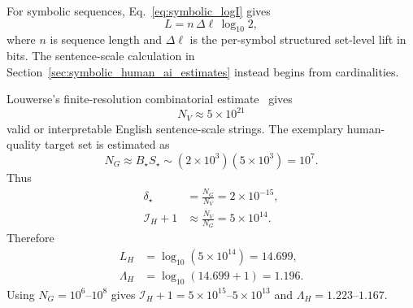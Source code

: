 \documentclass[
  aps,
  prresearch,
  reprint,
  amsmath,
  amssymb,
  superscriptaddress,
  nofootinbib,
  longbibliography
]{revtex4-2}
\newcommand{\calI}{\mathcal{I}}
\begin{document}
For symbolic sequences, Eq.~\eqref{eq:symbolic_logI} gives
\begin{equation}
    L=n\,\Delta\ell\,\log_{10}2,
    \label{eq:appendix_symbolic_lift}
\end{equation}
where \(n\) is sequence length and \(\Delta\ell\) is the per-symbol structured set-level lift in bits. The sentence-scale calculation in Section~\ref{sec:symbolic_human_ai_estimates} instead begins from cardinalities.

Louwerse's finite-resolution combinatorial estimate~\citep{louwerse2021sentences} gives
\begin{equation}
    N_V\approx 5\times10^{21}
\end{equation}
valid or interpretable English sentence-scale strings. The exemplary human-quality target set is estimated as
\begin{equation}
    N_G
    \approx
    B_\star S_\star
    \sim
    (2\times10^3)(5\times10^3)
    =
    10^7.
\end{equation}
Thus
\begin{align}
    \delta_\star
    &=
    \frac{N_G}{N_V}
    =
    2\times10^{-15},\\
    \calI_H+1
    &\approx
    \frac{N_V}{N_G}
    =
    5\times10^{14}.
\end{align}
Therefore
\begin{align}
    L_H
    &=
    \log_{10}(5\times10^{14})
    =
    14.699,\\
    \Lambda_H
    &=
    \log_{10}(14.699+1)
    =
    1.196.
\end{align}
Using \(N_G=10^6\)--\(10^8\) gives \(\calI_H+1=5\times10^{15}\)--\(5\times10^{13}\) and \(\Lambda_H=1.223\)--\(1.167\).
\end{document}
